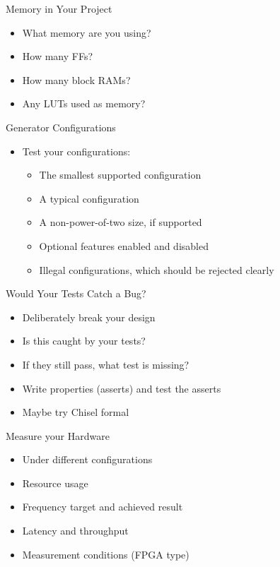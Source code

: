 \begin{frame}[fragile]{Memory in Your Project}
\begin{itemize}
\item What memory are you using?
\item How many FFs?
\item How many block RAMs?
\item Any LUTs used as memory?
\end{itemize}
\end{frame}

\begin{frame}[fragile]{Generator Configurations}
\begin{itemize}
\item Test your configurations:
\begin{itemize}
\item The smallest supported configuration
\item A typical configuration
\item A non-power-of-two size, if supported
\item Optional features enabled and disabled
\item Illegal configurations, which should be rejected clearly
\end{itemize}
\end{itemize}
\end{frame}

\begin{frame}[fragile]{Would Your Tests Catch a Bug?}
\begin{itemize}
\item Deliberately break your design
\item Is this caught by your tests?
\item If they still pass, what test is missing?
\item Write properties (asserts) and test the asserts
\item Maybe try Chisel formal
\end{itemize}
\end{frame}

\begin{frame}[fragile]{Measure your Hardware}
\begin{itemize}
\item Under different configurations
\item Resource usage
\item Frequency target and achieved result
\item Latency and throughput
\item Measurement conditions (FPGA type)
\end{itemize}
\end{frame}

